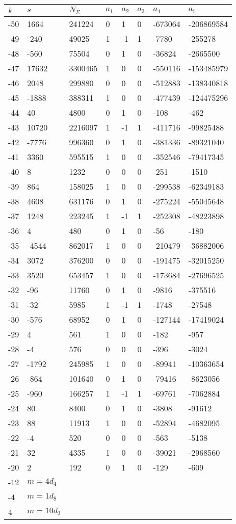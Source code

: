 \documentclass{amsart}
\begin{document}
\begin{longtable}{|l|l|l|lllll|}
\hline
$k$ & $s$ & $N_E$ & $a_1$ & $a_2$ & $a_3$ & $a_4$ & $a_5$\\
\hline
-50&1664&241224&0&1&0&-673064&-206869584\\
-49&-240&49025&1&-1&1&-7780&-255278\\
-48&-560&75504&0&1&0&-36824&-2665500\\
-47&17632&3300465&1&0&0&-550116&-153485979\\
-46&2048&299880&0&0&0&-512883&-138340818\\
-45&-1888&388311&1&0&0&-477439&-124475296\\
-44&40&4800&0&1&0&-108&-462\\
-43&10720&2216097&1&-1&1&-411716&-99825488\\
-42&-7776&996360&0&1&0&-381336&-89321040\\
-41&3360&595515&1&0&0&-352546&-79417345\\
-40&8&1232&0&0&0&-251&-1510\\
-39&864&158025&1&0&0&-299538&-62349183\\
-38&4608&631176&0&1&0&-275224&-55045648\\
-37&1248&223245&1&-1&1&-252308&-48223898\\
-36&4&480&0&1&0&-56&-180\\
-35&-4544&862017&1&0&0&-210479&-36882006\\
-34&3072&376200&0&0&0&-191475&-32015250\\
-33&3520&653457&1&0&0&-173684&-27696525\\
-32&-96&11760&0&1&0&-9816&-375516\\
-31&-32&5985&1&-1&1&-1748&-27548\\
-30&-576&68952&0&1&0&-127144&-17419024\\
-29&4&561&1&0&0&-182&-957\\
-28&-4&576&0&0&0&-396&-3024\\
-27&-1792&245985&1&0&0&-89941&-10363654\\
-26&-864&101640&0&1&0&-79416&-8623056\\
-25&-960&166257&1&-1&1&-69761&-7062884\\
-24&80&8400&0&1&0&-3808&-91612\\
-23&88&11913&1&0&0&-52894&-4682095\\
-22&-4&520&0&0&0&-563&-5138\\
-21&32&4335&1&0&0&-39021&-2968560\\
-20&2&192&0&1&0&-129&-609\\
-12&$m=4d_{4}$&&\multicolumn{5}{c|}{}\\
-4&$m=1d_{8}$&&\multicolumn{5}{c|}{}\\
4&$m=10d_{3}$&&\multicolumn{5}{c|}{}\\
\hline
\end{longtable}
\end{document}
